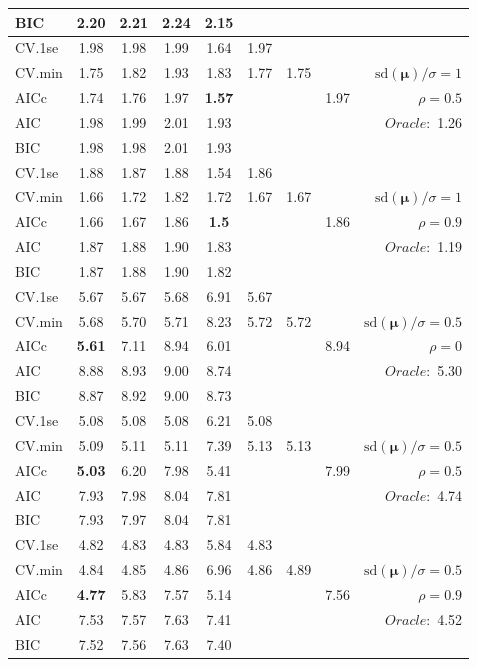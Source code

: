 \begin{table}
\begin{center}
\begin{tabular}{l*{7}{c}|r}
BIC & 2.20 & 2.21 & 2.24 & 2.15 & & & &  \\
 \hline 
CV.1se & 1.98 & 1.98 & 1.99 & 1.64 & 1.97 & & & \\
CV.min & 1.75 & 1.82 & 1.93 & 1.83 & 1.77 & 1.75 & & $\mathrm{sd}(\mathbf{\mu})/\sigma=1$ \\
AICc & 1.74 & 1.76 & 1.97 & {\bf 1.57} & & & 1.97 &  $\rho=0.5$ \\
AIC & 1.98 & 1.99 & 2.01 & 1.93 & & & &  \multirow{2}{*}{$Oracle: $ 1.26} \\
BIC & 1.98 & 1.98 & 2.01 & 1.93 & & & &  \\
 \hline 
CV.1se & 1.88 & 1.87 & 1.88 & 1.54 & 1.86 & & & \\
CV.min & 1.66 & 1.72 & 1.82 & 1.72 & 1.67 & 1.67 & & $\mathrm{sd}(\mathbf{\mu})/\sigma=1$ \\
AICc & 1.66 & 1.67 & 1.86 & {\bf 1.5} & & & 1.86 &  $\rho=0.9$ \\
AIC & 1.87 & 1.88 & 1.90 & 1.83 & & & &  \multirow{2}{*}{$Oracle: $ 1.19} \\
BIC & 1.87 & 1.88 & 1.90 & 1.82 & & & &  \\
 \hline 
CV.1se & 5.67 & 5.67 & 5.68 & 6.91 & 5.67 & & & \\
CV.min & 5.68 & 5.70 & 5.71 & 8.23 & 5.72 & 5.72 & & $\mathrm{sd}(\mathbf{\mu})/\sigma=0.5$ \\
AICc & {\bf 5.61} & 7.11 & 8.94 & 6.01 & & & 8.94 &  $\rho=0$ \\
AIC & 8.88 & 8.93 & 9.00 & 8.74 & & & &  \multirow{2}{*}{$Oracle: $ 5.30} \\
BIC & 8.87 & 8.92 & 9.00 & 8.73 & & & &  \\
 \hline 
CV.1se & 5.08 & 5.08 & 5.08 & 6.21 & 5.08 & & & \\
CV.min & 5.09 & 5.11 & 5.11 & 7.39 & 5.13 & 5.13 & & $\mathrm{sd}(\mathbf{\mu})/\sigma=0.5$ \\
AICc & {\bf 5.03} & 6.20 & 7.98 & 5.41 & & & 7.99 &  $\rho=0.5$ \\
AIC & 7.93 & 7.98 & 8.04 & 7.81 & & & &  \multirow{2}{*}{$Oracle: $ 4.74} \\
BIC & 7.93 & 7.97 & 8.04 & 7.81 & & & &  \\
 \hline 
CV.1se & 4.82 & 4.83 & 4.83 & 5.84 & 4.83 & & & \\
CV.min & 4.84 & 4.85 & 4.86 & 6.96 & 4.86 & 4.89 & & $\mathrm{sd}(\mathbf{\mu})/\sigma=0.5$ \\
AICc & {\bf 4.77} & 5.83 & 7.57 & 5.14 & & & 7.56 &  $\rho=0.9$ \\
AIC & 7.53 & 7.57 & 7.63 & 7.41 & & & &  \multirow{2}{*}{$Oracle: $ 4.52} \\
BIC & 7.52 & 7.56 & 7.63 & 7.40 & & & &  \\
 \hline 
\end{tabular}
\end{center}
\vspace{-1cm}
\end{table}




